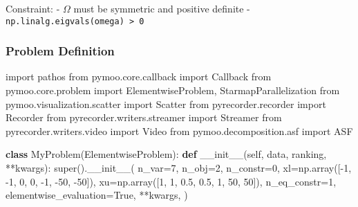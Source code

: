 \documentclass[
  letterpaper,
  DIV=11,
  numbers=noendperiod]{scrartcl}
\newenvironment{Shaded}{\begin{snugshade}}{\end{snugshade}}
\newcommand{\BuiltInTok}[1]{\textcolor[rgb]{0.00,0.23,0.31}{#1}}
\newcommand{\DecValTok}[1]{\textcolor[rgb]{0.68,0.00,0.00}{#1}}
\newcommand{\FloatTok}[1]{\textcolor[rgb]{0.68,0.00,0.00}{#1}}
\newcommand{\FunctionTok}[1]{\textcolor[rgb]{0.28,0.35,0.67}{#1}}
\newcommand{\ImportTok}[1]{\textcolor[rgb]{0.00,0.46,0.62}{#1}}
\newcommand{\KeywordTok}[1]{\textcolor[rgb]{0.00,0.23,0.31}{\textbf{#1}}}
\newcommand{\NormalTok}[1]{\textcolor[rgb]{0.00,0.23,0.31}{#1}}
\newcommand{\OperatorTok}[1]{\textcolor[rgb]{0.37,0.37,0.37}{#1}}
\newcommand{\VariableTok}[1]{\textcolor[rgb]{0.07,0.07,0.07}{#1}}
\begin{document}
Constraint: - \(\Omega\) must be symmetric and positive definite -
\texttt{np.linalg.eigvals(omega)\ \textgreater{}\ 0}

\subsubsection{Problem Definition}\label{problem-definition}

\begin{Shaded}
\begin{Highlighting}[]
\ImportTok{import}\NormalTok{ pathos}
\ImportTok{from}\NormalTok{ pymoo.core.callback }\ImportTok{import}\NormalTok{ Callback}
\ImportTok{from}\NormalTok{ pymoo.core.problem }\ImportTok{import}\NormalTok{ ElementwiseProblem, StarmapParallelization}
\ImportTok{from}\NormalTok{ pymoo.visualization.scatter }\ImportTok{import}\NormalTok{ Scatter}
\ImportTok{from}\NormalTok{ pyrecorder.recorder }\ImportTok{import}\NormalTok{ Recorder}
\ImportTok{from}\NormalTok{ pyrecorder.writers.streamer }\ImportTok{import}\NormalTok{ Streamer}
\ImportTok{from}\NormalTok{ pyrecorder.writers.video }\ImportTok{import}\NormalTok{ Video}
\ImportTok{from}\NormalTok{ pymoo.decomposition.asf }\ImportTok{import}\NormalTok{ ASF}


\KeywordTok{class}\NormalTok{ MyProblem(ElementwiseProblem):}
    \KeywordTok{def} \FunctionTok{\_\_init\_\_}\NormalTok{(}\VariableTok{self}\NormalTok{, data, ranking, }\OperatorTok{**}\NormalTok{kwargs):}
        \BuiltInTok{super}\NormalTok{().}\FunctionTok{\_\_init\_\_}\NormalTok{(}
\NormalTok{            n\_var}\OperatorTok{=}\DecValTok{7}\NormalTok{,}
\NormalTok{            n\_obj}\OperatorTok{=}\DecValTok{2}\NormalTok{,}
\NormalTok{            n\_constr}\OperatorTok{=}\DecValTok{0}\NormalTok{,}
\NormalTok{            xl}\OperatorTok{=}\NormalTok{np.array([}\OperatorTok{{-}}\DecValTok{1}\NormalTok{, }\OperatorTok{{-}}\DecValTok{1}\NormalTok{, }\DecValTok{0}\NormalTok{, }\DecValTok{0}\NormalTok{, }\OperatorTok{{-}}\DecValTok{1}\NormalTok{, }\OperatorTok{{-}}\DecValTok{50}\NormalTok{, }\OperatorTok{{-}}\DecValTok{50}\NormalTok{]),}
\NormalTok{            xu}\OperatorTok{=}\NormalTok{np.array([}\DecValTok{1}\NormalTok{, }\DecValTok{1}\NormalTok{, }\FloatTok{0.5}\NormalTok{, }\FloatTok{0.5}\NormalTok{, }\DecValTok{1}\NormalTok{, }\DecValTok{50}\NormalTok{, }\DecValTok{50}\NormalTok{]),}
\NormalTok{            n\_eq\_constr}\OperatorTok{=}\DecValTok{1}\NormalTok{,}
\NormalTok{            elementwise\_evaluation}\OperatorTok{=}\VariableTok{True}\NormalTok{,}
            \OperatorTok{**}\NormalTok{kwargs,}
\NormalTok{        )}


\end{Highlighting}
\end{Shaded}
\end{document}
